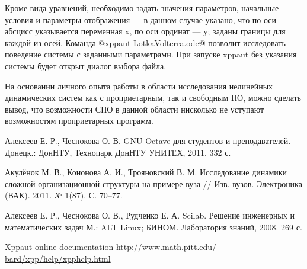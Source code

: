\documentclass[10pt, a5paper]{article}
\begin{document}
Кроме вида уравнений, необходимо задать значения параметров, начальные условия и параметры отображения --- в данном случае указано, что по оси абсцисс указывается переменная x, по оси ординат --- y; заданы границы для каждой из осей. Команда @xppaut LotkaVolterra.ode@ позволит исследовать поведение системы с заданными параметрами.
При запуске xppaut без указания системы будет открыт диалог выбора файла.

На основании личного опыта работы в области исследования нелинейных динамических систем как с проприетарным, так и свободным ПО, можно сделать вывод, что возможности СПО в данной области нисколько не уступают возможностям проприетарных программ.


\begin{thebibliography}{9}

 Алексеев Е. Р., Чеснокова О. В. GNU Octave для студентов и преподавателей. Донецк.: ДонНТУ, Технопарк ДонНТУ УНИТЕХ, 2011. 332 с.

 Акулёнок М. В., Кононова А. И., Трояновский В. М. Исследование динамики сложной организационной структуры на примере вуза // Изв. вузов. Электроника (ВАК). 2011. № 1(87). С. 70–77.

 Алексеев Е. Р., Чеснокова О. В., Рудченко Е. А. Scilab. Решение инженерных и математических задач М.: ALT Linux; БИНОМ. Лаборатория знаний, 2008. 269 с.

 Xppaut online documentation  \url{http://www.math.pitt.edu/ bard/xpp/help/xpphelp.html}

\end{thebibliography}
\end{document}
